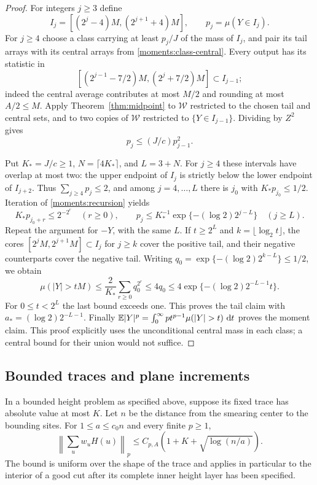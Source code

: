 \begin{proof}
For integers $j\geq3$ define
\[
 I_j=[(2^j-4)M,(2^{j+1}+4)M],\qquad p_j=\mu(Y\in I_j).
\]
For $j\geq4$ choose a class carrying at least $p_j/J$ of the mass of
$I_j$, and pair its tail arrays with its central arrays from
\eqref{moments:class-central}.  Every output has its statistic in
\[
 [(2^{j-1}-7/2)M,(2^j+7/2)M]\subset I_{j-1};
\]
indeed the central average contributes at most $M/2$ and rounding at
most $A/2\leq M$.  Apply Theorem~\ref{thm:midpoint} to $\mathcal W$ restricted
to the chosen tail and central sets, and to two copies of $\mathcal W$ restricted
to $\{Y\in I_{j-1}\}$.  Dividing by $Z^2$ gives
\begin{equation}\label{moments:recursion}
 p_j\leq (J/c)p_{j-1}^2.
\end{equation}

Put $K_*=J/c\geq1$, $N=\lceil4K_*\rceil$, and $L=3+N$.
For $j\geq4$ these intervals have overlap at most two: the upper
endpoint of $I_j$ is strictly below the lower endpoint of $I_{j+2}$.
Thus $\sum_{j\geq4}p_j\leq2$, and among $j=4,\ldots,L$ there is
$j_0$ with $K_*p_{j_0}\leq1/2$.  Iteration of
\eqref{moments:recursion} yields
\[
 K_*p_{j_0+r}\leq2^{-2^r}\quad(r\geq0),
 \qquad
 p_j\leq K_*^{-1}
 \exp\{- (\log2)2^{j-L}\}\quad(j\geq L).
\]
Repeat the argument for $-Y$, with the same $L$.  If $t\geq2^L$ and
$k=\lfloor\log_2t\rfloor$, the cores
$[2^jM,2^{j+1}M]\subset I_j$ for $j\geq k$ cover the positive tail,
and their negative counterparts cover the negative tail.  Writing
$q_0=\exp\{-(\log2)2^{k-L}\}\leq1/2$, we obtain
\[
 \mu(|Y|>tM)
 \leq\frac2{K_*}\sum_{r\geq0}q_0^{2^r}
 \leq4q_0
 \leq4\exp\{- (\log2)2^{-L-1}t\}.
\]
For $0\leq t<2^L$ the last bound exceeds one.  This proves the tail
claim with $a_*=(\log2)2^{-L-1}$.  Finally
$\E|Y|^p=\int_0^\infty pt^{p-1}\mu(|Y|>t)\,\dd t$ proves the moment
claim.  This proof explicitly uses the unconditional central mass in
each class; a central bound for their union would not suffice.
\end{proof}

\subsection{Bounded traces and plane increments}

\begin{proposition}
\label{prop:smearing}
In a bounded height problem as specified above, suppose its fixed trace
has absolute value at most $K$.  Let $n$ be the distance from the
smearing center to the bounding sites.  For
$1\leq a\leq c_0n$ and every finite $p\geq1$,
\begin{equation}\label{moments:smearing-bound}
 \left\|\sum_uw_uH(u)\right\|_p
 \leq C_{p,A}\left(1+K+\sqrt{\log(n/a)}\right).
\end{equation}
The bound is uniform over the shape of the trace and applies in
particular to the interior of a good cut after its complete inner
height layer has been specified.
\end{proposition}

